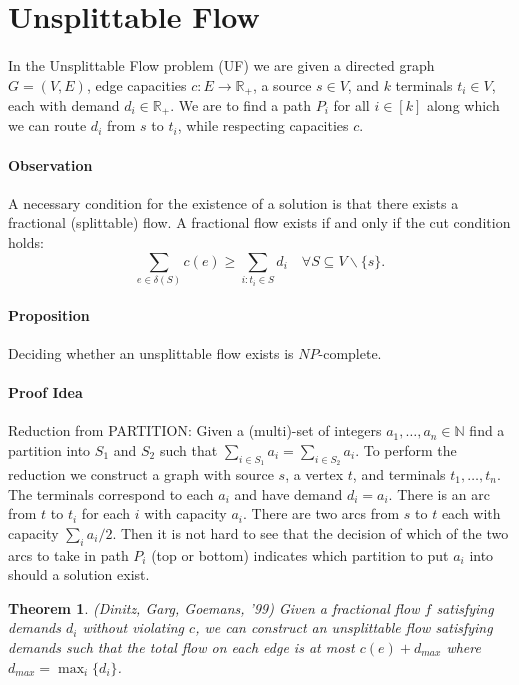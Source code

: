 \documentclass[letterpaper,12pt,oneside,onecolumn]{article}
\newcommand{\N}{\mathbb{N}} \newcommand{\R}{\mathbb{R}}
\newtheorem{theorem}[fact]{Theorem}
\begin{document}
\section{Unsplittable Flow}
\paragraph{}
In the Unsplittable Flow problem (UF) we are given a directed graph $G = (V,E)$, edge capacities $c : E \rightarrow \R_+$, a source $s \in V$, and $k$ terminals $t_i \in V$, each with demand $d_i \in \R_+$. We are to find a path $P_i$ for all $i \in [k]$ along which we can route $d_i$ from $s$ to $t_i$, while respecting capacities $c$.
\paragraph{Observation}
A necessary condition for the existence of a solution is that there exists a fractional (splittable) flow. A fractional flow exists if and only if the cut condition holds:
$$\sum_{e\in \delta(S)} c(e) \geq \sum_{i:t_i \in S} d_i \quad \forall S \subseteq V\backslash \{s\}.$$
\paragraph{Proposition}
Deciding whether an unsplittable flow exists is $NP$-complete.
\paragraph{Proof Idea}
Reduction from PARTITION: Given a (multi)-set of integers $a_1,\dots, a_n \in \N$ find a partition into $S_1$ and $S_2$ such that $\sum_{i \in S_1} a_i = \sum_{i\in S_2} a_i$. To perform the reduction we construct a graph with source $s$, a vertex $t$, and terminals $t_1, \dots, t_n$. The terminals correspond to each $a_i$ and have demand $d_i = a_i$. There is an arc from $t$ to $t_i$ for each $i$ with capacity $a_i$. There are two arcs from $s$ to $t$ each with capacity $\sum_{i} a_i /2$. Then it is not hard to see that the decision of which of the two arcs to take in path $P_i$ (top or bottom) indicates which partition to put $a_i$ into should a solution exist.
\begin{theorem}
(Dinitz, Garg, Goemans, '99) Given a fractional flow $f$ satisfying demands $d_i$ without violating $c$, we can construct an unsplittable flow satisfying demands such that the total flow on each edge is at most $c(e) + d_{max}$ where $d_{max} = \max_i \{d_i\}$.
\end{theorem}
\end{document}
